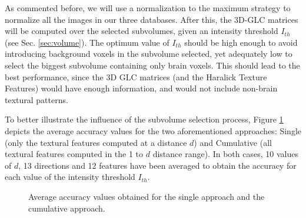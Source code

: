 As commented before, we will use a normalization to the maximum strategy to normalize all the images in our three databases. After this, the 3D-GLC matrices will be computed over the selected subvolumes, given an intensity threshold $I_{th}$ (see Sec. \ref{sec:volume}). The optimum value of $I_{th}$ should be high enough to avoid introducing background voxels in the subvolume selected, yet adequately low to select the biggest subvolume containing only brain voxels. This should lead to the best performance, since the 3D GLC matrices (and the Haralick Texture Features) would have enough information, and would not include non-brain textural patterns. 

To better illustrate the influence of the subvolume selection process, Figure \ref{fig:featuresIth} depicts the average accuracy values for the two aforementioned approaches: Single (only the textural features computed at a distance $d$) and Cumulative (all textural features computed in the 1 to $d$ distance range). In both cases, 10 values of $d$, 13 directions and 12 features have been averaged to obtain the accuracy for each value of the intensity threshold $I_{th}$. 

\begin{figure}%
	\centering
	\caption{Average accuracy values obtained for \protect{} the single approach and \protect{} the cumulative approach.}
	\label{fig:featuresIth}
\end{figure}

